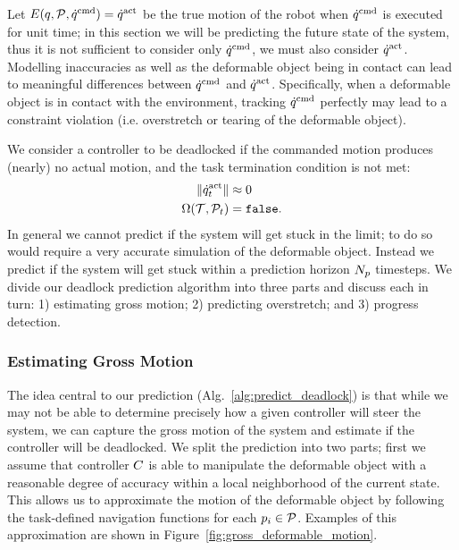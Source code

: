 Let $E(q, \mathcal{P}, \dot{q}^{\textrm{cmd}}) = \dot{q}^{\textrm{act}}$ be the true motion of the robot when $\dot{q}^{\textrm{cmd}}$ is executed for unit time; in this section we will be predicting the future state of the system, thus it is not sufficient to consider only $\dot{q}^{\textrm{cmd}}$, we must also consider $\dot{q}^{\textrm{act}}$.  Modelling inaccuracies as well as the deformable object being in contact can lead to meaningful differences between $\dot{q}^{\textrm{cmd}}$ and $\dot{q}^{\textrm{act}}$. Specifically, when a deformable object is in contact with the environment, tracking $\dot{q}^{\textrm{cmd}}$ perfectly may lead to a constraint violation (i.e. overstretch or tearing of the deformable object).

We consider a controller to be deadlocked if the commanded motion produces (nearly) no actual motion, and the task termination condition is not met:
\begin{equation}
    \begin{split}
        \| \dot{q}^{\textrm{act}}_t \|                &\approx 0 \\
        \Omega(\mathcal{T}, \mathcal{P}_t) &= \texttt{false}.
        \label{eqn:stuck}
    \end{split}
\end{equation}
In general we cannot predict if the system will get stuck in the limit; to do so would require a very accurate simulation of the deformable object. Instead we predict if the system will get stuck within a prediction horizon $N_p$ timesteps. We divide our deadlock prediction algorithm into three parts and discuss each in turn: 1) estimating gross motion; 2) predicting overstretch; and 3) progress detection.



\subsubsection{Estimating Gross Motion}

The idea central to our prediction (Alg.~\ref{alg:predict_deadlock}) is that while we may not be able to determine precisely how a given controller will steer the system, we can capture the gross motion of the system and estimate if the controller will be deadlocked. We split the prediction into two parts; first we assume that controller $C$ is able to manipulate the deformable object with a reasonable degree of accuracy within a local neighborhood of the current state. This allows us to approximate the motion of the deformable object by following the task-defined navigation functions for each $p_i \in \mathcal{P}$. Examples of this approximation are shown in Figure~\ref{fig:gross_deformable_motion}.


